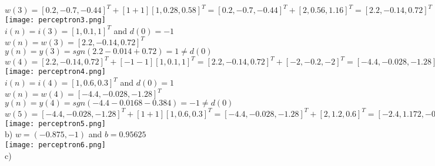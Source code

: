 \documentclass{article}
\begin{document}
\\ $ w(3) = [0.2,-0.7,-0.44]^{T} +[1+1][1, 0.28, 0.58]^{T}= [0.2,-0.7,-0.44]^{T} +[2, 0.56, 1.16]^{T}= [2.2,-0.14,0.72]^{T}$
\\  \texttt{[image: perceptron3.png]}
\\ $i(n) = i(3) = [1, 0.1, 1]^{T}$ and $ d(0) = -1$
\\ $w(n) = w(3)=[2.2,-0.14,0.72]^{T}$
\\ $y(n) = y(3) = sgn(2.2-0.014+0.72) = 1 \neq d(0)$
\\ $ w(4) = [2.2,-0.14,0.72]^{T} +[-1-1][1, 0.1, 1]^{T}= [2.2,-0.14,0.72]^{T} +[-2, -0.2, -2]^{T}= [-4.4,-0.028,-1.28]^{T}$
\\  \texttt{[image: perceptron4.png]}
\\ $i(n) = i(4) = [1, 0.6, 0.3]^{T}$ and $ d(0) = 1$
\\ $w(n) = w(4)=[-4.4,-0.028,-1.28]^{T}$
\\ $y(n) = y(4) = sgn(-4.4-0.0168-0.384) = -1 \neq d(0)$
\\ $ w(5) = [-4.4,-0.028,-1.28]^{T} +[1+1][1, 0.6, 0.3]^{T}= [-4.4,-0.028,-1.28]^{T} +[2, 1.2, 0.6]^{T}= [-2.4,1.172,-0.68]^{T}$
\\  \texttt{[image: perceptron5.png]}
\\
b) $w = (-0.875, -1)$ and $b = 0.95625$
\\ \texttt{[image: perceptron6.png]}
\\
c) 
\end{document}
